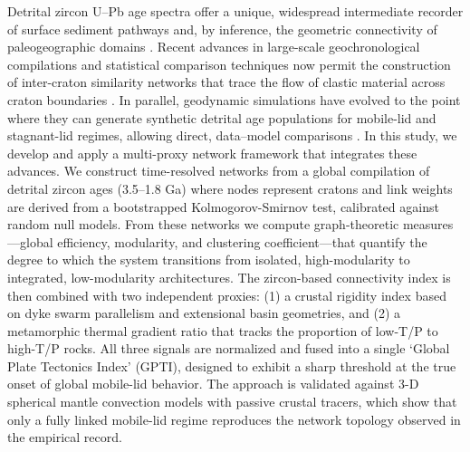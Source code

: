 \documentclass{article}
\begin{document}
Detrital zircon U–Pb age spectra offer a unique, widespread intermediate recorder of surface sediment pathways and, by inference, the geometric connectivity of paleogeographic domains \cite{gehrels2014detrital,puetz2018zircon}. Recent advances in large-scale geochronological compilations and statistical comparison techniques now permit the construction of inter-craton similarity networks that trace the flow of clastic material across craton boundaries \cite{roberts2015zircon,sundell2023network}. In parallel, geodynamic simulations have evolved to the point where they can generate synthetic detrital age populations for mobile-lid and stagnant-lid regimes, allowing direct, data–model comparisons \cite{oneill2020tectonic,lenardic2018influence}. In this study, we develop and apply a multi-proxy network framework that integrates these advances. We construct time-resolved networks from a global compilation of detrital zircon ages (3.5–1.8 Ga) where nodes represent cratons and link weights are derived from a bootstrapped Kolmogorov-Smirnov test, calibrated against random null models. From these networks we compute graph-theoretic measures—global efficiency, modularity, and clustering coefficient—that quantify the degree to which the system transitions from isolated, high-modularity to integrated, low-modularity architectures. The zircon-based connectivity index is then combined with two independent proxies: (1) a crustal rigidity index based on dyke swarm parallelism and extensional basin geometries, and (2) a metamorphic thermal gradient ratio that tracks the proportion of low-T/P to high-T/P rocks. All three signals are normalized and fused into a single ‘Global Plate Tectonics Index’ (GPTI), designed to exhibit a sharp threshold at the true onset of global mobile-lid behavior. The approach is validated against 3-D spherical mantle convection models with passive crustal tracers, which show that only a fully linked mobile-lid regime reproduces the network topology observed in the empirical record.
\end{document}
